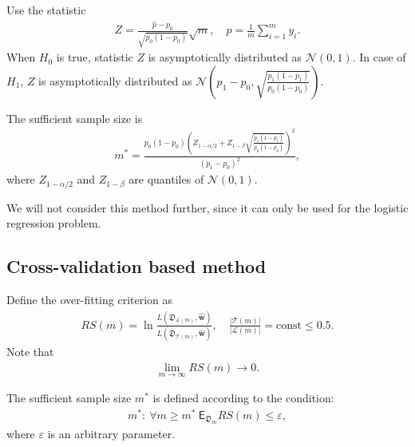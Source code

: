 \documentclass[
11pt,%
tightenlines,%
twoside,%
onecolumn,%
nofloats,%
nobibnotes,%
nofootinbib,%
superscriptaddress,%
noshowpacs,%
centertags]%
{revtex4}
\begin{document}
Use the statistic
\begin{equation}
\label{eq:hb:3}
\begin{aligned}
	Z = \frac{\hat{p}-p_0}{\sqrt{p_0(1-p_0)}}\sqrt{m}, \quad \hat{p} = \frac{1}{m}\sum_{i=1}^{m}y_i.
\end{aligned}
\end{equation}
When $H_0$ is true, statistic $Z$ is asymptotically distributed as $\mathcal{N}\left(0, 1\right)$. In case of $H_1$, $Z$ is asymptotically distributed as $ \mathcal{N}\left(p_1-p_0, \sqrt{\frac{p_1(1-p_1)}{p_0(1-p_0)}}\right)$.
      
The sufficient sample size is
\begin{equation}
\label{eq:hb:4}
\begin{aligned}
	m^* = \frac{p_0(1-p_0)\left(Z_{1-\alpha/2} + Z_{1-\beta}\sqrt{\frac{p_1(1-p_1)}{p_0(1-p_0)}}\right)^2}{(p_1-p_0)^2},
\end{aligned}
\end{equation}
where $Z_{1-\alpha/2}$ and $Z_{1-\beta}$ are quantiles of $\mathcal{N}\left(0, 1\right)$.
    
We will not consider this method further, since it can only be used for the logistic regression problem.
    
\subsection{Cross-validation based method}
Define the over-fitting criterion as
\begin{equation}
\label{eq:hb:5}
\begin{aligned}
	RS(m) = \ln\frac{L(\mathfrak{D}_{\mathcal{L}(m)}, \hat{\textbf{w}})}{L(\mathfrak{D}_{\mathcal{T}(m)}, \hat{\textbf{w}})}, \quad \frac{|\mathcal{T}(m)|}{|\mathcal{L}(m)|} = \text{const} \leq 0.5.
\end{aligned}
\end{equation}
Note that 
\begin{equation}
\label{eq:hb:6}
\begin{aligned}
	\lim_{m\to \infty}RS(m) \to 0.
\end{aligned}
\end{equation}

The sufficient sample size $m^*$ is defined according to the condition:
\begin{equation}
\label{eq:hb:7}
\begin{aligned}
	m^*:~\forall m \geq m^*~\mathsf{E}_{\mathfrak{D}_{m}}RS(m) \leq \varepsilon,
\end{aligned}
\end{equation}
where $\varepsilon$ is an arbitrary parameter.
\end{document}
